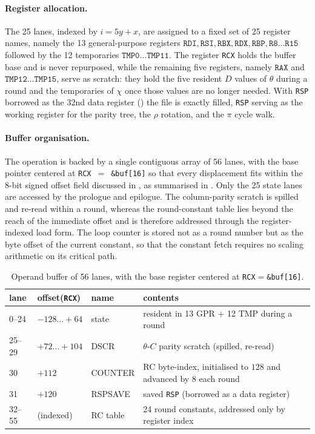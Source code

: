 \paragraph{Register allocation.}
The 25 lanes, indexed by $i = 5y + x$, are assigned to a fixed set of 25
register names, namely the 13 general-purpose registers
$\texttt{RDI},\texttt{RSI},\texttt{RBX},\texttt{RDX},\texttt{RBP},
\texttt{R8}\ldots\texttt{R15}$ followed by the 12 temporaries
$\texttt{TMP0}\ldots\texttt{TMP11}$. The register \texttt{RCX} holds the buffer
base and is never repurposed, while the remaining five registers, namely
$\texttt{RAX}$ and $\texttt{TMP12}\ldots\texttt{TMP15}$, serve as scratch: they
hold the five resident $D$ values of $\theta$ during a round and the temporaries
of $\chi$ once those values are no longer needed. With \texttt{RSP} borrowed as
the 32nd data register () the file is exactly filled,
\texttt{RSP} serving as the working register for the parity tree, the $\rho$
rotation, and the $\pi$ cycle walk.

\paragraph{Buffer organisation.}
The operation is backed by a single contiguous array of 56 lanes, with the base
pointer centered at \texttt{RCX}~$=$~\texttt{\&buf[16]} so that every
displacement fits within the 8-bit signed offset field discussed in
, as summarised in . Only the 25
state lanes are accessed by the prologue and epilogue. The column-parity
scratch is spilled and re-read within a round, whereas the round-constant table
lies beyond the reach of the immediate offset and is therefore addressed
through the register-indexed load form. The loop counter is stored not as a
round number but as the byte offset of the current constant, so that the
constant fetch requires no scaling arithmetic on its critical path.

\begin{table}[t]
\centering
\caption{Operand buffer of 56 lanes, with the base register centered at
\texttt{RCX}$=$\texttt{\&buf[16]}.}
\label{tab:keccak-buffer}
\small
\begin{tabular}{@{}llll@{}}
\toprule
lane & offset(\texttt{RCX}) & name & contents \\
\midrule
0--24  & $-128\ldots{+}64$ & state    & resident in 13 GPR $+$ 12 TMP during a round \\
25--29 & $+72\ldots{+}104$ & DSCR     & $\theta$-$C$ parity scratch (spilled, re-read) \\
30     & $+112$            & COUNTER  & RC byte-index, initialised to $128$ and advanced by $8$ each round \\
31     & $+120$            & RSPSAVE  & saved \texttt{RSP} (borrowed as a data register) \\
32--55 & (indexed)         & RC table & 24 round constants, addressed only by register index \\
\bottomrule
\end{tabular}
\end{table}

